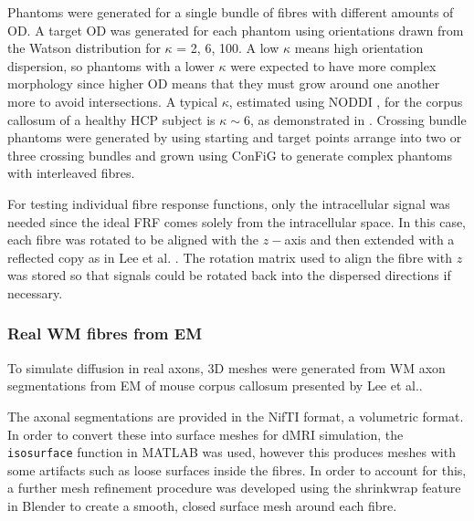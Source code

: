 Phantoms were generated for a single bundle of fibres with different amounts of \ac{OD}. A target \ac{OD} was generated for each phantom using orientations drawn from the Watson distribution \cite{Mardia2008} for $\kappa$ = 2, 6, 100.
A low $\kappa$ means high orientation dispersion, so phantoms with a lower $\kappa$ were expected to have more complex morphology since higher \ac{OD} means that they must grow around one another more to avoid intersections. A typical $\kappa$, estimated using \ac{NODDI} \cite{Zhang2012}, for the corpus callosum of a healthy \ac{HCP} \cite{Sotiropoulos2013a,VanEssen2012} subject is $\kappa \sim 6$, as demonstrated in .
Crossing bundle phantoms were generated by using starting and target points arrange into two or three crossing bundles and grown using \ac{ConFiG} to generate complex phantoms with interleaved fibres.

For testing individual fibre response functions, only the intracellular signal was needed since the ideal \ac{FRF} comes solely from the intracellular space. In this case, each fibre was rotated to be aligned with the $z-$axis and then extended with a reflected copy as in Lee et al. \cite{Lee2019a}. The rotation matrix used to align the fibre with $z$ was stored so that signals could be rotated back into the dispersed directions if necessary.


\subsubsection{Real WM fibres from EM}
\label{sec:frf_real_axon_meshing}
To simulate diffusion in real axons, 3D meshes were generated from \ac{WM} axon segmentations from \acf{EM} of mouse corpus callosum presented by Lee et al.\cite{Lee2019b}.

The axonal segmentations are provided in the NifTI format, a volumetric format. In order to convert these into surface meshes for \ac{dMRI} simulation, the \texttt{isosurface} function in MATLAB was used, however this produces meshes with some artifacts such as loose surfaces inside the fibres.
In order to account for this, a further mesh refinement procedure was developed using the shrinkwrap feature in Blender to create a smooth, closed surface mesh around each fibre.

